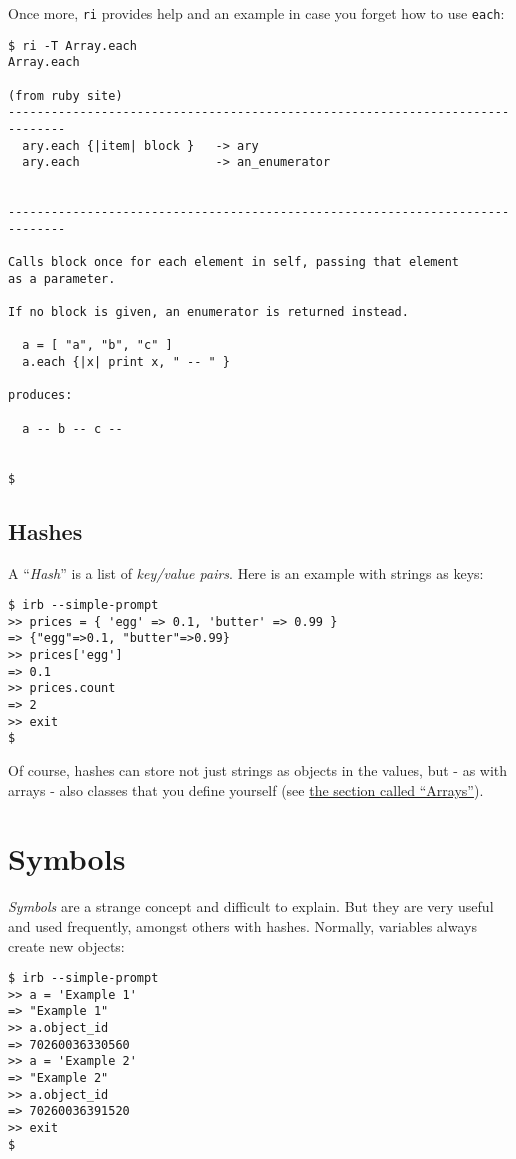 \documentclass[a4paper]{book}
\newcommand{\chap}[1]{\newpage\thispagestyle{empty}\chapter{#1}\label{chap:\thechapter}}
\begin{document}
Once more, \texttt{ri} provides help and an example in case you forget how to use \texttt{each}:

\begin{shaded}\begin{verbatim}
$ ri -T Array.each
Array.each

(from ruby site)
------------------------------------------------------------------------------
  ary.each {|item| block }   -> ary
  ary.each                   -> an_enumerator


------------------------------------------------------------------------------

Calls block once for each element in self, passing that element
as a parameter.

If no block is given, an enumerator is returned instead.

  a = [ "a", "b", "c" ]
  a.each {|x| print x, " -- " }

produces:

  a -- b -- c --


$
\end{verbatim}\end{shaded}

\section{Hashes}\label{hashes}

A “\emph{Hash}” is a list of \emph{key/value pairs}. Here is an example with strings as keys:

\begin{shaded}\begin{verbatim}
$ irb --simple-prompt
>> prices = { 'egg' => 0.1, 'butter' => 0.99 }
=> {"egg"=>0.1, "butter"=>0.99}
>> prices['egg']
=> 0.1
>> prices.count
=> 2
>> exit
$
\end{verbatim}\end{shaded}

Of course, hashes can store not just strings as objects in the values, but - as with arrays - also classes that you define yourself (see \hyperref[rubyux5farray]{the section called “Arrays”}).

\chap{Symbols}\label{symbols}

\emph{Symbols} are a strange concept and difficult to explain. But they are very useful and used frequently, amongst others with hashes. Normally, variables always create new objects:

\begin{shaded}\begin{verbatim}
$ irb --simple-prompt
>> a = 'Example 1'
=> "Example 1"
>> a.object_id
=> 70260036330560
>> a = 'Example 2'
=> "Example 2"
>> a.object_id
=> 70260036391520
>> exit
$
\end{verbatim}\end{shaded}
\end{document}

